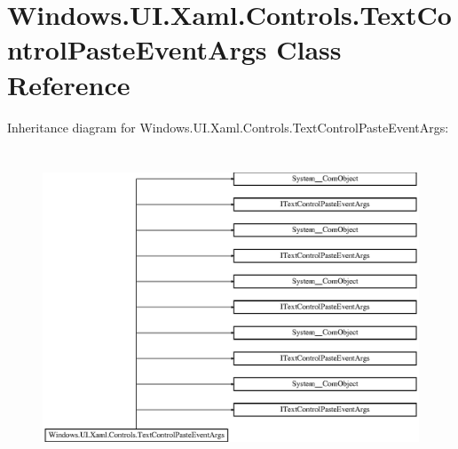 \hypertarget{class_windows_1_1_u_i_1_1_xaml_1_1_controls_1_1_text_control_paste_event_args}{}\section{Windows.\+U\+I.\+Xaml.\+Controls.\+Text\+Control\+Paste\+Event\+Args Class Reference}
\label{class_windows_1_1_u_i_1_1_xaml_1_1_controls_1_1_text_control_paste_event_args}
Inheritance diagram for Windows.\+U\+I.\+Xaml.\+Controls.\+Text\+Control\+Paste\+Event\+Args\+:\begin{figure}[H]
\begin{center}
\leavevmode
\includegraphics[height=9.447853cm]{class_windows_1_1_u_i_1_1_xaml_1_1_controls_1_1_text_control_paste_event_args}
\end{center}
\end{figure}
